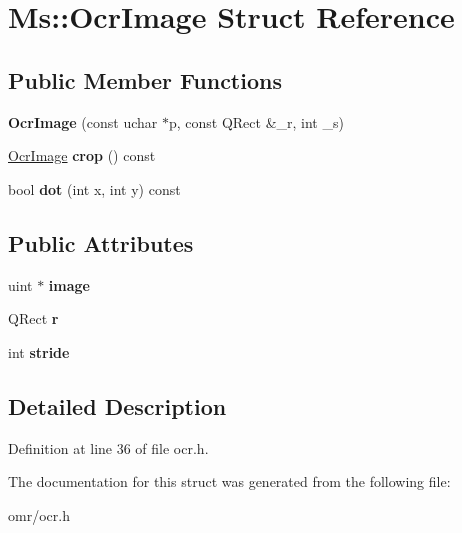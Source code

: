 \hypertarget{struct_ms_1_1_ocr_image}{}\section{Ms\+:\+:Ocr\+Image Struct Reference}
\label{struct_ms_1_1_ocr_image}
\subsection*{Public Member Functions}
\begin{DoxyCompactItemize}
\item 
\mbox{\label{struct_ms_1_1_ocr_image_a97938f029fa6ab56c4e1edd2c99dc18d}} 
{\bfseries Ocr\+Image} (const uchar $\ast$p, const Q\+Rect \&\+\_\+r, int \+\_\+s)
\item 
\mbox{\label{struct_ms_1_1_ocr_image_ab7c3a0e01d77bfc69d5f716825e5656a}} 
\hyperlink{struct_ms_1_1_ocr_image}{Ocr\+Image} {\bfseries crop} () const
\item 
\mbox{\label{struct_ms_1_1_ocr_image_a0d11119981c6dd52f8cb8092c7732dfc}} 
bool {\bfseries dot} (int x, int y) const
\end{DoxyCompactItemize}
\subsection*{Public Attributes}
\begin{DoxyCompactItemize}
\item 
\mbox{\label{struct_ms_1_1_ocr_image_a488d186657adf8734dcf60920054c08e}} 
uint $\ast$ {\bfseries image}
\item 
\mbox{\label{struct_ms_1_1_ocr_image_aec7443e9676fcde19acd08a5bb434086}} 
Q\+Rect {\bfseries r}
\item 
\mbox{\label{struct_ms_1_1_ocr_image_a818c565000c76e7b0450504819f62e19}} 
int {\bfseries stride}
\end{DoxyCompactItemize}


\subsection{Detailed Description}


Definition at line 36 of file ocr.\+h.



The documentation for this struct was generated from the following file\+:\begin{DoxyCompactItemize}
\item 
omr/ocr.\+h\end{DoxyCompactItemize}
